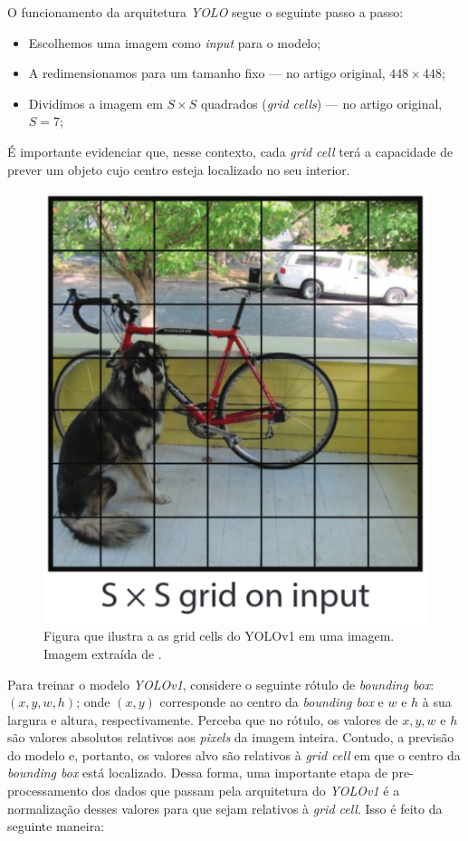 O funcionamento da arquitetura \emph{YOLO} segue o seguinte passo a passo:

\begin{itemize}
    \item Escolhemos uma imagem como \emph{input} para o modelo;
    \item A redimensionamos para um tamanho fixo --- no artigo original, $448 \times 448$;
    \item Dividimos a imagem em $S \times S$ quadrados (\emph{grid cells}) --- no artigo original, $S = 7$;
\end{itemize}

É importante evidenciar que, nesse contexto, cada \emph{grid cell} terá a capacidade de prever um objeto cujo centro esteja localizado no seu interior.

\begin{figure}
    \centering
    \includegraphics[width=0.5\linewidth]{images/grid_cells.png}
    \caption{\label{fig:grid_cells} Figura que ilustra a as grid cells do YOLOv1 em uma imagem. Imagem extraída de \cite{yolo}.}
\end{figure}

Para treinar o modelo \emph{YOLOv1}, considere o seguinte rótulo de \emph{bounding box}:$(x, y, w, h)$; onde $(x,y)$ corresponde ao centro da \emph{bounding box} e $w$ e $h$ à sua largura e altura, respectivamente. Perceba que no rótulo, os valores de $x, y, w$ e $h$ são valores absolutos relativos aos \emph{pixels} da imagem inteira. Contudo, a previsão do modelo e, portanto, os valores alvo são relativos à \emph{grid cell} em que o centro da \emph{bounding box} está localizado. Dessa forma, uma importante etapa de pre-processamento dos dados que passam pela arquitetura do \emph{YOLOv1} é a normalização desses valores para que sejam relativos à \emph{grid cell}. Isso é feito da seguinte maneira:

